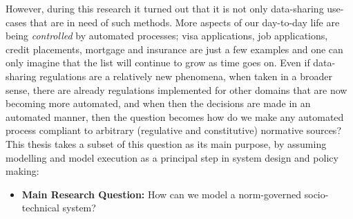 However, during this research it turned out that it is not only data-sharing use-cases that are in need of such methods. More aspects of our day-to-day life are being \textit{controlled} by automated processes; visa applications, job applications, credit placements, mortgage and insurance are just a few examples and one can only imagine that the list will continue to grow as time goes on. Even if data-sharing regulations are a relatively new phenomena, when taken in a broader sense, there are already regulations implemented for other domains that are now becoming more automated, and when then the decisions are made in an automated manner, then the question becomes how do we make any automated process compliant to arbitrary (regulative and constitutive) normative sources? This thesis takes a subset of this question as its main purpose, by assuming modelling and model execution as a principal step in system design and policy making:

\begin{itemize}
    \item \textbf{Main Research Question:} How can we model a norm-governed socio-technical system?
\end{itemize}


